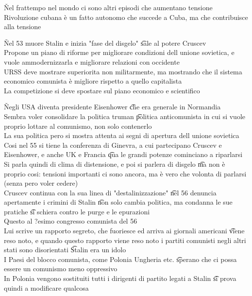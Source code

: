 \documentclass[12pt]{article}
\begin{document}
\v

Nel frattempo nel mondo ci sono altri episodi che aumentano tensione \\
Rivoluzione cubana è un fatto autonomo che succede a Cuba, ma che contribuisce alla tensione

\v

Nel 53 muore Stalin e inizia "fase del disgelo" \t sale al potere Cruscev \\
Propone un piano di riforme per migliorare condizioni dell unione sovietica, e vuole ammodernizzarla e migliorare relazioni con occidente \\
URSS deve mostrare superiorita non militarmente, ma mostrando che il sistema economico comunista è migliore rispetto a quello capitalista \\
La competizione si deve spostare sul piano economico e scientifico

\v

Negli USA diventa presidente Eisenhower \t che era generale in Normandia \\
Sembra voler consolidare la politica truman \t politica anticomunista in cui si vuole proprio lottare al comunismo, non solo contenerlo \\
La sua politica pero si mostra attenta ai segni di apertura dell unione sovietica \\
Cosi nel 55 si tiene la conferenza di Ginevra, a cui partecipano Cruscev e Eisenhower, e anche UK e Francia \t qua le grandi potenze cominciano a riparlarsi \\
Si parla quindi di clima di distensione, e poi si parlera di disgelo \t ma non è proprio cosi: tensioni importanti ci sono ancora, ma è vero che volonta di parlarsi (senza pero voler cedere) \\
Cruscev continua con la sua linea di "destalinizzazione" \t nel 56 denuncia apertamente i crimini di Stalin \t non solo cambia politica, ma condanna le sue pratiche \t si schiera contro le purge e le epurazioni \\
Questo al ?esimo congresso comunista del 56 \\
Lui scrive un rapporto segreto, che fuoriesce ed arriva ai giornali americani \t viene reso noto, e quando questo rapporto viene reso noto i partiti comunisti negli altri stati sono disorientati \t Stalin era un idolo \\
I Paesi del blocco comunista, come Polonia Ungheria etc. \t sperano che ci possa essere un comunismo meno oppressivo \\
In Polonia vengono sostituiti tutti i dirigenti di partito legati a Stalin \t si prova quindi a modificare qualcosa
\end{document}
